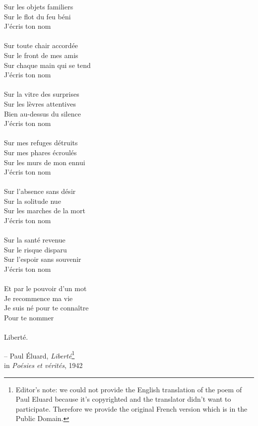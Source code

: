 Sur les objets familiers \\
Sur le flot du feu béni \\
J\textquoteright écris ton nom \\
 \\
Sur toute chair accordée \\
Sur le front de mes amis \\
Sur chaque main qui se tend \\
J\textquoteright écris ton nom \\
 \\
Sur la vitre des surprises \\
Sur les lèvres attentives \\
Bien au-dessus du silence \\
J\textquoteright écris ton nom \\
 \\
Sur mes refuges détruits \\
Sur mes phares écroulés \\
Sur les murs de mon ennui \\
J\textquoteright écris ton nom \\
 \\
Sur l\textquoteright absence sans désir \\
Sur la solitude nue \\
Sur les marches de la mort \\
J\textquoteright écris ton nom \\
 \\
Sur la santé revenue \\
Sur le risque disparu \\
Sur l\textquoteright espoir sans souvenir \\
J\textquoteright écris ton nom \\
 \\
\newpage
\noindent
Et par le pouvoir d\textquoteright un mot \\
Je recommence ma vie \\
Je suis né pour te connaître \\
Pour te nommer \\
 \\
Liberté.

-- Paul Éluard, \textit{Liberté}\footnote{Editor's note: we could not provide the English translation of the poem of Paul Eluard because it's copyrighted and the translator didn't want to participate. Therefore we provide the original French version which is in the Public Domain.}\\
in \textit{Poésies et vérités}, 1942\\


